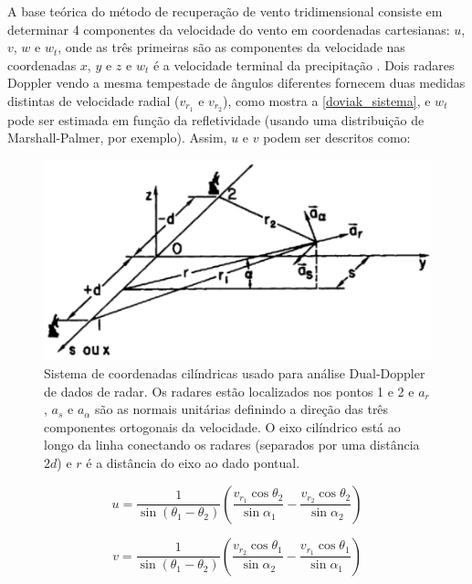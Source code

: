 A base teórica do método de recuperação de vento tridimensional consiste em determinar 4 componentes da velocidade do vento em coordenadas cartesianas: $u$, $v$, $w$ e $w_t$, onde as três primeiras são as componentes da velocidade nas coordenadas $x$, $y$ e $z$ e $w_t$ é a velocidade terminal da precipitação \cite{Rinehart1997}. Dois radares Doppler vendo a mesma tempestade de ângulos diferentes fornecem duas medidas distintas de velocidade radial ($v_{r_1}$ e $v_{r_2}$), como mostra a \autoref{doviak_sistema}, e $w_t$ pode ser estimada em função da refletividade (usando uma distribuição de Marshall-Palmer, por exemplo). Assim, $u$ e $v$ podem ser descritos como:

\begin{figure}[htb]
	\begin{center}
		\caption{Sistema de coordenadas cilíndricas usado para análise Dual-Doppler de dados de radar. Os radares estão localizados nos pontos 1 e 2 e $a_r$, $a_s$ e $a_\alpha$ são as normais unitárias definindo a direção das três componentes ortogonais da velocidade. O eixo cilíndrico está ao longo da linha conectando os radares (separados por uma distância $2d$) e $r$ é a distância do eixo ao dado pontual.} 
		\label{doviak_sistema}
		\includegraphics[width=0.8\columnwidth]{figs/system_doviak_ptbr.png}
	\end{center}
\end{figure}

\begin{equation}
u=\frac{1}{\sin{(\theta_1 - \theta_2)}}\left(\frac{v_{r_1}\cos{\theta_2}}{\sin{\alpha_1}}-\frac{v_{r_2}\cos{\theta_2}}{\sin{\alpha_2}}\right)
\end{equation}

\begin{equation}
v=\frac{1}{\sin{(\theta_1 - \theta_2)}}\left(\frac{v_{r_2}\cos{\theta_1}}{\sin{\alpha_2}}-\frac{v_{r_1}\cos{\theta_1}}{\sin{\alpha_1}}\right)
\end{equation}


